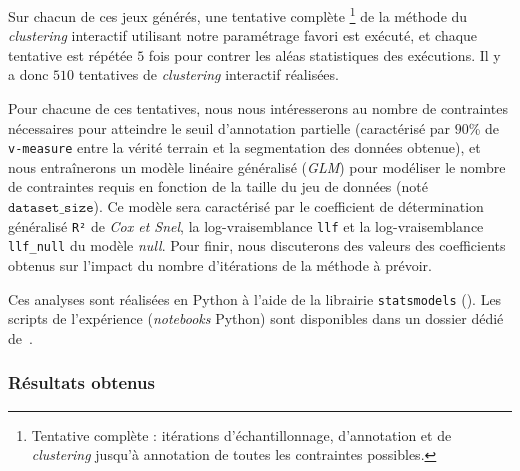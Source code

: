 			Sur chacun de ces jeux générés, une tentative complète
			\footnote{Tentative complète : itérations d'échantillonnage, d'annotation et de \textit{clustering} jusqu'à annotation de toutes les contraintes possibles.}
			de la méthode du \textit{clustering} interactif utilisant notre paramétrage favori est exécuté, et chaque tentative est répétée $5$ fois pour contrer les aléas statistiques des exécutions.
			Il y a donc $510$ tentatives de \textit{clustering} interactif réalisées.
			
			Pour chacune de ces tentatives, nous nous intéresserons au nombre de contraintes nécessaires pour atteindre le seuil d'annotation partielle (caractérisé par $90$\% de \texttt{v-measure} entre la vérité terrain et la segmentation des données obtenue), et nous entraînerons un modèle linéaire généralisé (\textit{GLM}) pour modéliser le nombre de contraintes requis en fonction de la taille du jeu de données (noté $\texttt{dataset\_size}$).
			Ce modèle sera caractérisé par le coefficient de détermination généralisé \texttt{R²} de \textit{Cox et Snel}, la log-vraisemblance \texttt{llf} et la log-vraisemblance \texttt{llf\_null} du modèle \textit{null}.
			Pour finir, nous discuterons des valeurs des coefficients obtenus sur l'impact du nombre d'itérations de la méthode à prévoir.

			\begin{leftBarInformation}
				Ces analyses sont réalisées en Python à l'aide de la librairie \texttt{statsmodels} (\cite{seabold:2010}).
				Les scripts de l'expérience (\textit{notebooks} Python) sont disponibles dans un dossier dédié de~\cite{schild:cognitivefactory-interactive-clustering-comparative-study:2021}.
			\end{leftBarInformation}

		\subsubsection{Résultats obtenus}
		
